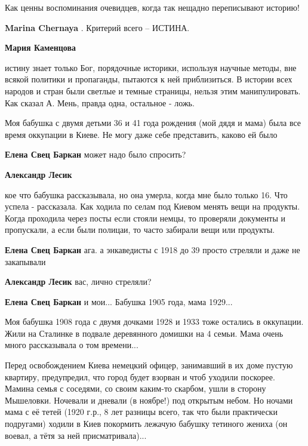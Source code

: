 \begin{itemize}
Как ценны воспоминания очевидцев, когда так нещадно переписывают историю!

\begin{itemize} %
\textbf{Marina Chernaya} . Критерий всего – ИСТИНА.

\textbf{Мария Каменцова} 

истину знает только Бог, порядочные историки, используя научные методы, вне
всякой политики и пропаганды, пытаются к ней приблизиться. В истории всех
народов и стран были светлые и темные страницы, нельзя этим манипулировать. Как
сказал А. Мень, правда одна, остальное - ложь.

\end{itemize} %


Моя бабушка с двумя детьми 36 и 41 года рождения (мой дядя и мама) была все
время оккупации в Киеве. Не могу даже себе представить, каково ей было

\begin{itemize} %
\textbf{Елена Свец Баркан} может надо было спросить?

\begin{itemize} %
\textbf{Александр Лесик} 

кое что бабушка рассказывала, но она умерла, когда мне было только 16. Что
успела - рассказала. Как ходила по селам под Киевом менять вещи на продукты.
Когда проходила через посты если стояли немцы, то проверяли документы и
пропускали, а если были полицаи, то часто забирали вещи или продукты.

\textbf{Елена Свец Баркан} ага. а энкаведисты с 1918 до 39 просто стреляли и даже не закапывали

\textbf{Александр Лесик} вас, лично стреляли?
\end{itemize} %

\textbf{Елена Свец Баркан} и мои... Бабушка 1905 года, мама 1929...


Моя бабушка 1908 года с двумя дочками 1928 и 1933 тоже остались в оккупации.
Жили на Сталинке в подвале деревянного домишки на 4 семьи. Мама очень много
рассказывала о том времени...

Перед освобождением Киева немецкий офицер, занимавший в их доме пустую
квартиру, предупредил, что город будет взорван и чтоб уходили поскорее. Мамина
семья с соседями, со своим каким-то скарбом, ушли в сторону Мышеловки. Ночевали
и дневали (в ноябре!) под открытым небом. Но ночами мама с её тетей (1920 г.р.,
8 лет разницы всего, так что были практически подругами) ходили в Киев
покормить лежачую бабушку тетиного жениха (он воевал, а тётя за ней
присматривала)...


\end{itemize}
\end{itemize}
